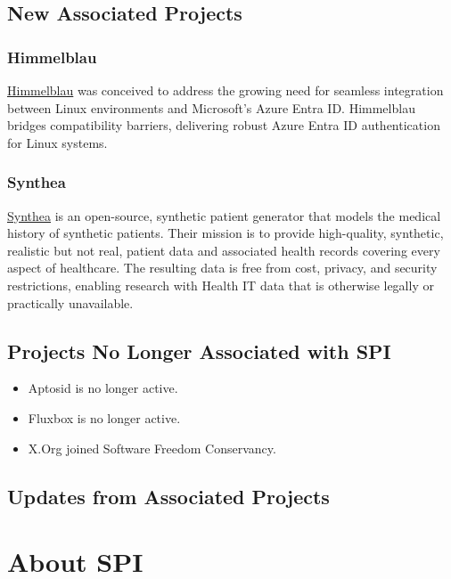 \documentclass[a4paper]{report}
\begin{document}
\section{New Associated Projects}

\subsection{Himmelblau}

\href{https://himmelblau-idm.org/}{Himmelblau} was conceived to address the growing need for seamless integration between Linux environments and Microsoft's Azure Entra ID. Himmelblau bridges compatibility barriers, delivering robust Azure Entra ID authentication for Linux systems.

\subsection{Synthea}

\href{https://synthetichealth.github.io/synthea/}{Synthea} is an open-source, synthetic patient generator that models the medical history of synthetic patients. Their mission is to provide high-quality, synthetic, realistic but not real, patient data and associated health records covering every aspect of healthcare. The resulting data is free from cost, privacy, and security restrictions, enabling research with Health IT data that is otherwise legally or practically unavailable.

\section{Projects No Longer Associated with SPI}

\begin{itemize}

\item Aptosid is no longer active.

\item Fluxbox is no longer active.

\item X.Org joined Software Freedom Conservancy.

\end{itemize}

\section{Updates from Associated Projects}


\appendix
\chapter{About SPI}
\end{document}
